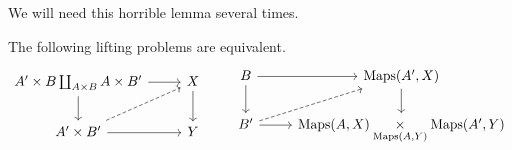 \documentclass[main.tex]{subfiles}
\begin{document}
We will need this horrible lemma several times.
\begin{lemma}
  \label{lemma:equivalent_lifting_problems}
  The following lifting problems are equivalent.
  \begin{equation*}
    \begin{tikzcd}
      A' \times B \coprod_{A \times B} A \times B'
      \arrow[r]
      \arrow[d]
      & X
      \arrow[d]
      \\
      A' \times B'
      \arrow[r]
      \arrow[ur, dashed]
      & Y
    \end{tikzcd}
    \qquad
    \begin{tikzcd}
      B
      \arrow[r]
      \arrow[d]
      & \Maps(A', X)
      \arrow[d]
      \\
      B'
      \arrow[r]
      \arrow[ur, dashed]
      & \Maps(A, X) \underset{\Maps(A, Y)}{\times} \Maps(A', Y)
    \end{tikzcd}
  \end{equation*}
\end{lemma}
\end{document}
